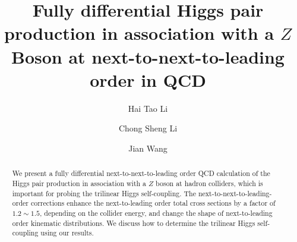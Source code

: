 \documentclass[a4paper,amsmath,preprintnumbers,showpacs,twocolumn,prl,superscriptaddress, nofootinbib]{revtex4}
\begin{document}





\title{Fully differential Higgs pair production in association with a $Z$ Boson at next-to-next-to-leading order in QCD}

\author{Hai Tao Li}
\author{Chong Sheng Li}
\author{Jian Wang}






\begin{abstract}
We present a fully differential next-to-next-to-leading order QCD calculation of the Higgs pair production in association with a $Z$ boson
at hadron colliders, which is important for probing the trilinear Higgs self-coupling.
The next-to-next-to-leading-order corrections enhance the next-to-leading order  total cross sections by a factor of $1.2\sim 1.5$, depending on the collider energy, and change the shape of next-to-leading order  kinematic distributions.
We  discuss how to  determine  the trilinear Higgs self-coupling using our results. 



\end{abstract}


\maketitle

\end{document}
